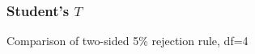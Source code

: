 \documentclass[handout]{beamer}
\begin{document}


   \begin{frame}
   \frametitle{Student's $T$}
   \begin{center}
   \end{center}
   Comparison of two-sided {\color{blue} 5\% rejection rule}, df=4
   \end{frame}
\end{document}
